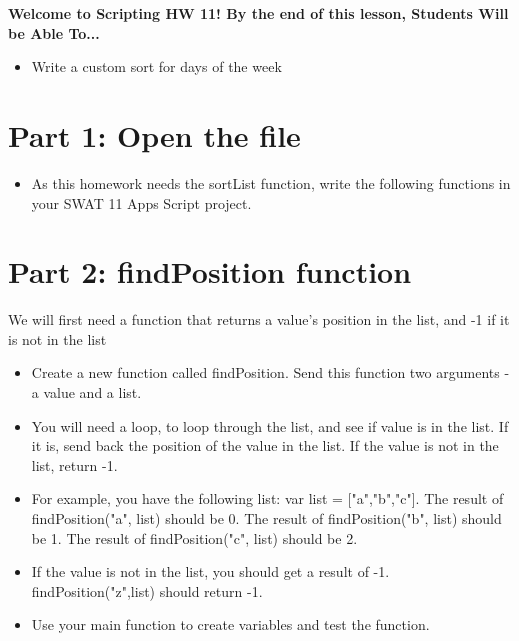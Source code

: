 \documentclass{article}
\newcommand{\AName}{Scripting HW 11}
\begin{document}
\textbf{Welcome to \AName!  By the end of this lesson, Students Will be Able To...}
\begin{itemize}
    \item Write a custom sort for days of the week
\end{itemize}


\section*{Part 1: Open the file}
\begin{itemize}
    \item As this homework needs the sortList function, write the following functions in your SWAT 11 Apps Script project.
\end{itemize}

\section*{Part 2: findPosition function}
We will first need a function that returns a value's position in the list, and -1 if it is not in the list
\begin{itemize}
    \item Create a new function called findPosition.  Send this function two arguments - a value and a list.
    \item You will need a loop, to loop through the list, and see if value is in the list.  If it is, send back the position of the value in the list.  If the value is not in the list, return -1.
    \item For example, you have the following list: var list = ["a","b","c"].  The result of findPosition("a", list) should be 0.  The result of findPosition("b", list) should be 1. The result of findPosition("c", list) should be 2.
    \item If the value is not in the list, you should get a result of -1.  findPosition("z",list) should return -1.
    \item Use your main function to create variables and test the function.  
\end{itemize}
\end{document}
